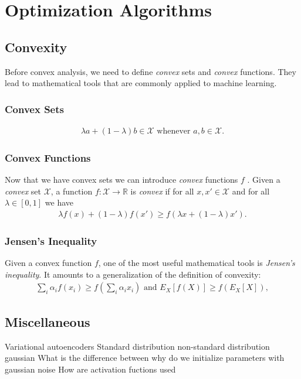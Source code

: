 \documentclass[a4paper,12pt]{article}
\theoremstyle{definition}
\begin{document}
    \section{Optimization Algorithms}
    
    \subsection*{Convexity}
    Before convex analysis, we need to define \emph{convex} sets and \emph{convex} functions. They lead to mathematical tools that are commonly applied to machine learning.

    \subsubsection*{Convex Sets}
    \begin{equation*}
        \begin{aligned}
            \lambda  a + (1-\lambda)  b \in \mathcal{X} \text{ whenever } a, b \in \mathcal{X}.
        \end{aligned}
    \end{equation*}

    \subsubsection*{Convex Functions}

    Now that we have convex sets we can introduce \emph{convex} functions $f$ . Given a \emph{convex} set $\mathcal{X}$, a function $f: \mathcal{X} \to \mathbb{R}$ is \emph{convex} if for all 
    $x, x' \in \mathcal{X}$ and for all $\lambda \in [0, 1]$ we have
    \begin{equation*}
        \begin{aligned}
            \lambda f(x) + (1-\lambda) f(x') \geq f(\lambda x + (1-\lambda) x').
        \end{aligned}
    \end{equation*}

    \subsubsection*{Jensen's Inequality}
    Given a convex function $f$, one of the most useful mathematical tools is \emph{Jensen's inequality}. It amounts to a generalization of the definition of convexity:
    \begin{equation*}
        \begin{aligned}
           \sum_i \alpha_i f(x_i)  \geq f\left(\sum_i \alpha_i x_i\right)    \text{ and }    E_X[f(X)]  \geq f\left(E_X[X]\right),
        \end{aligned}
    \end{equation*}










    \newpage
    \subsection*{Miscellaneous}
    Variational autoencoders
    Standard distribution
    non-standard distribution gaussian
    What is the difference between 
    why do we initialize parameters with gaussian noise
    How are activation fuctions used
\end{document}
